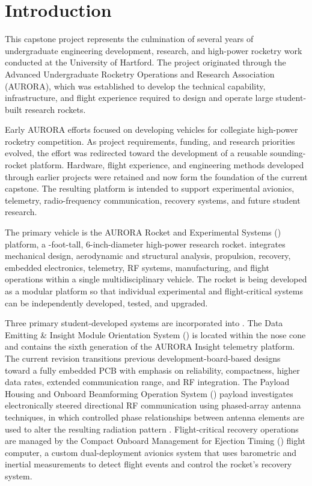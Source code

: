 \onecolumn
\section{Introduction}

This capstone project represents the culmination of several years of undergraduate engineering development, research, and high-power rocketry work conducted at the University of Hartford. The project originated through the Advanced Undergraduate Rocketry Operations and Research Association (AURORA), which was established to develop the technical capability, infrastructure, and flight experience required to design and operate large student-built research rockets.

Early AURORA efforts focused on developing vehicles for collegiate high-power rocketry competition. As project requirements, funding, and research priorities evolved, the effort was redirected toward the development of a reusable sounding-rocket platform. Hardware, flight experience, and engineering methods developed through earlier projects were retained and now form the foundation of the current capstone. The resulting platform is intended to support experimental avionics, telemetry, radio-frequency communication, recovery systems, and future student research.

The primary vehicle is the AURORA Rocket and Experimental Systems (\ares{}) platform, a \RHeight{}-foot-tall, 6-inch-diameter high-power research rocket. \ares{} integrates mechanical design, aerodynamic and structural analysis, propulsion, recovery, embedded electronics, telemetry, RF systems, manufacturing, and flight operations within a single multidisciplinary vehicle. The rocket is being developed as a modular platform so that individual experimental and flight-critical systems can be independently developed, tested, and upgraded.

Three primary student-developed systems are incorporated into \ares{}. The Data Emitting \& Insight Module Orientation System (\deimos{}) is located within the nose cone and contains the sixth generation of the AURORA Insight telemetry platform. The current revision transitions previous development-board-based designs toward a fully embedded PCB with emphasis on reliability, compactness, higher data rates, extended communication range, and RF integration. The Payload Housing and Onboard Beamforming Operation System (\phobos{}) payload investigates electronically steered directional RF communication using phased-array antenna techniques, in which controlled phase relationships between antenna elements are used to alter the resulting radiation pattern \cite{balanis}. Flight-critical recovery operations are managed by the Compact Onboard Management for Ejection Timing (\comet{}) flight computer, a custom dual-deployment avionics system that uses barometric and inertial measurements to detect flight events and control the rocket's recovery system.

